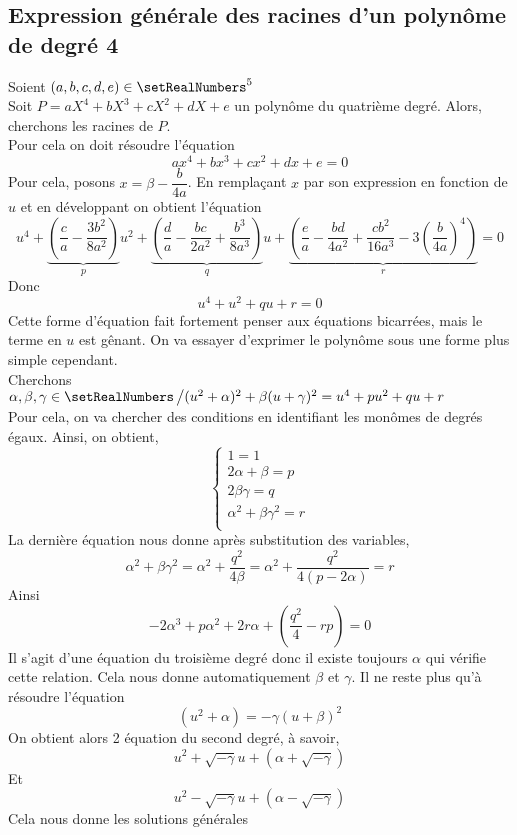 \subsection{Expression générale des racines d'un polynôme de degré 4}
Soient $(a,b,c,d,e)\in\setRealNumbers^5$\\
Soit $P = aX^4+bX^3+cX^2+dX+e$ un polynôme du quatrième degré. Alors, cherchons les racines de $P$.\\ 
Pour cela on doit résoudre l'équation 
\[ax^4+bx^3+cx^2+dx+e=0\]
Pour cela, posons $x = \beta - \dfrac{b}{4a}$. En remplaçant $x$ par son expression en fonction de $u$ et en développant on obtient l'équation
\[
u^4+\underbrace{\left(\dfrac{c}{a}-\dfrac{3b^2}{8a^2}\right)}_{p}u^2 + \underbrace{\left(\dfrac{d}{a}-\dfrac{bc}{2a^2}+\dfrac{b^3}{8a^3}\right)}_{q}u + \underbrace{\left(\dfrac{e}{a}-\dfrac{bd}{4a^2}+\dfrac{c b^2}{16a^3}-3\left(\dfrac{b}{4a}\right)^4\right)}_{r}= 0
\]
Donc 
\[
u^4+u^2+qu+r=0
\]
Cette forme d'équation fait fortement penser aux équations bicarrées, mais le terme en $u$ est gênant. On va essayer d'exprimer le polynôme sous une forme plus simple cependant.\\
Cherchons $\alpha, \beta, \gamma \in \setRealNumbers \left/(u^2+\alpha)^2+\beta (u+\gamma)^2=u^4+pu^2+qu+r\right.$\\
Pour cela, on va chercher des conditions en identifiant les monômes de degrés égaux. Ainsi, on obtient, 
\[
\left\{\begin{array}{l}
1=1\\
2\alpha+\beta = p\\
2 \beta \gamma = q\\
\alpha^2+\beta \gamma^2 = r\\
\end{array}\right.
\] 
La dernière équation nous donne après substitution des variables,
\[
\alpha^2+\beta \gamma^2=\alpha^2 + \dfrac{q^2}{4\beta}=\alpha^2 + \dfrac{q^2}{4(p-2\alpha)}=r
\]
Ainsi 
\[
-2\alpha^3+p\alpha^2+2r\alpha+\left(\dfrac{q^2}{4}-rp\right)=0
\]
Il s'agit d'une équation du troisième degré donc il existe toujours $\alpha$ qui vérifie cette relation. Cela nous donne automatiquement $\beta$ et $\gamma$. Il ne reste plus qu'à résoudre l'équation 
\[
(u^2+\alpha)=-\gamma(u+\beta)^2
\]
On obtient alors 2 équation du second degré, à savoir,
\[
u^2 + \sqrt{-\gamma}u + \left(\alpha + \sqrt{-\gamma}\right)
\]
Et
\[
u^2 - \sqrt{-\gamma}u + \left(\alpha - \sqrt{-\gamma}\right)
\]
Cela nous donne les solutions générales